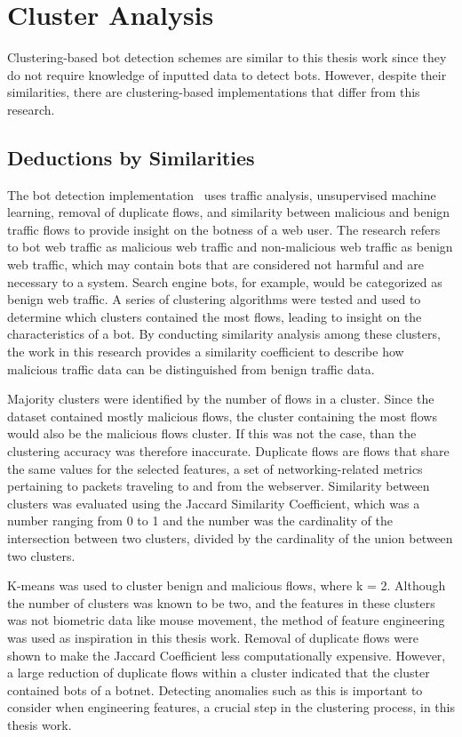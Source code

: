 
\section{Cluster Analysis}\label{sec:cluster-analysis}
Clustering-based bot detection schemes are similar to this thesis work since they do not require knowledge of inputted data to detect bots.
However, despite their similarities, there are clustering-based implementations that differ from this research.

\subsection{Deductions by Similarities}\label{subsec:deductions-by-similarities}
The bot detection implementation~\cite{bot_detection_wei_alvarez} uses traffic analysis, unsupervised machine learning, removal of duplicate flows, and similarity between malicious and benign traffic flows to provide insight on the botness of a web user.
The research refers to bot web traffic as malicious web traffic and non-malicious web traffic as benign web traffic, which may contain bots that are considered not harmful and are necessary to a system.
Search engine bots, for example, would be categorized as benign web traffic.
A series of clustering algorithms were tested and used to determine which clusters contained the most flows, leading to insight on the characteristics of a bot.
By conducting similarity analysis among these clusters, the work in this research provides a similarity coefficient to describe how malicious traffic data can be distinguished from benign traffic data.

Majority clusters were identified by the number of flows in a cluster.
Since the dataset contained mostly malicious flows, the cluster containing the most flows would also be the malicious flows cluster.
If this was not the case, than the clustering accuracy was therefore inaccurate.
Duplicate flows are flows that share the same values for the selected features, a set of networking-related metrics pertaining to packets traveling to and from the webserver.
Similarity between clusters was evaluated using the Jaccard Similarity Coefficient, which was a number ranging from 0 to 1 and the number was the cardinality of the intersection between two clusters, divided by the cardinality of the union between two clusters.

K-means was used to cluster benign and malicious flows, where k = 2.
Although the number of clusters was known to be two, and the features in these clusters was not biometric data like mouse movement, the method of feature engineering was used as inspiration in this thesis work.
Removal of duplicate flows were shown to make the Jaccard Coefficient less computationally expensive.
However, a large reduction of duplicate flows within a cluster indicated that the cluster contained bots of a botnet.
Detecting anomalies such as this is important to consider when engineering features, a crucial step in the clustering process, in this thesis work.

